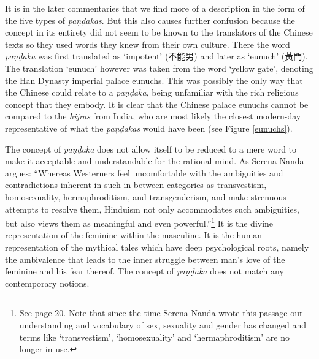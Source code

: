 It is in the later commentaries that we find more of a description in the form of the five types of {\em paṇḍakas}. But this also causes further confusion because the concept in its entirety did not seem to be known to the translators of the Chinese texts so they used words they knew from their own culture. There the word {\em paṇḍaka} was first translated as `impotent' (不能男) and later as `eunuch' (黃門). The translation `eunuch' however was taken from the word `yellow gate', denoting the Han Dynasty imperial palace eunuchs. This was possibly the only way that the Chinese could relate to a {\em paṇḍaka}, being unfamiliar with the rich religious concept that they embody. It is clear that the Chinese palace eunuchs cannot be compared to the {\em hijras} from India, who are most likely the closest modern-day representative of what the {\em paṇḍakas} would have been (see Figure \ref{eunuchs}).

The concept of {\em paṇḍaka} does not allow itself to be reduced to a mere word to make it acceptable and understandable for the rational mind. As Serena Nanda argues: ``Whereas Westerners feel uncomfortable with the ambiguities and contradictions inherent in such in-between categories as transvestism, homosexuality, hermaphroditism, and transgenderism, and make strenuous attempts to resolve them, Hinduism not only accommodates such ambiguities, but also views them as meaningful and even powerful.''\footnote{See \cite{nanda} page 20. Note that since the time Serena Nanda wrote this passage our understanding and vocabulary of sex, sexuality and gender has changed and terms like `transvestism', `homosexuality' and `hermaphroditism' are no longer in use.} It is the divine representation of the feminine within the masculine. It is the human representation of the mythical tales which have deep psychological roots, namely the ambivalence that leads to the inner struggle between man's love of the feminine and his fear thereof. The concept of {\em paṇḍaka} does not match any contemporary notions. 
